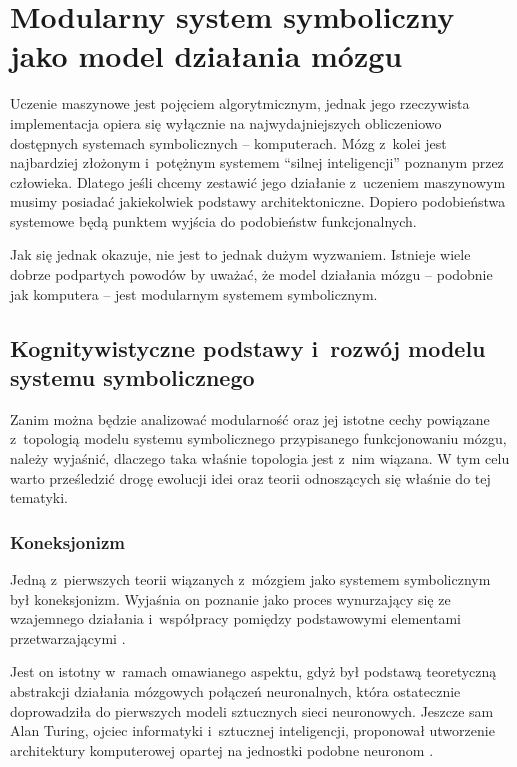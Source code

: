 \chapter{Modularny system symboliczny jako model działania mózgu}
\label{ch:modularity}

Uczenie maszynowe jest pojęciem algorytmicznym, jednak jego rzeczywista implementacja opiera się wyłącznie na najwydajniejszych obliczeniowo dostępnych systemach symbolicznych -- komputerach.
Mózg z~kolei jest najbardziej złożonym i~potężnym systemem ``silnej inteligencji'' poznanym przez człowieka.
Dlatego jeśli chcemy zestawić jego działanie z~uczeniem maszynowym musimy posiadać jakiekolwiek podstawy architektoniczne.
Dopiero podobieństwa systemowe będą punktem wyjścia do podobieństw funkcjonalnych.

Jak się jednak okazuje, nie jest to jednak dużym wyzwaniem.
Istnieje wiele dobrze podpartych powodów by uważać, że model działania mózgu -- podobnie jak komputera -- jest modularnym systemem symbolicznym.

\section{Kognitywistyczne podstawy i~rozwój modelu systemu symbolicznego}
\label{cognitive-basics}

Zanim można będzie analizować modularność oraz jej istotne cechy powiązane z~topologią modelu systemu symbolicznego przypisanego funkcjonowaniu mózgu, należy wyjaśnić, dlaczego taka właśnie topologia jest z~nim wiązana.
W tym celu warto prześledzić drogę ewolucji idei oraz teorii odnoszących się właśnie do tej tematyki.

\subsection{Koneksjonizm}

Jedną z~pierwszych teorii wiązanych z~mózgiem jako systemem symbolicznym był koneksjonizm.
Wyjaśnia on poznanie jako proces wynurzający się ze wzajemnego działania i~współpracy pomiędzy podstawowymi elementami przetwarzającymi \cite{bechtel1993case}.

Jest on istotny w~ramach omawianego aspektu, gdyż był podstawą teoretyczną abstrakcji działania mózgowych połączeń neuronalnych, która ostatecznie doprowadziła do pierwszych modeli sztucznych sieci neuronowych.
Jeszcze sam Alan Turing, ojciec informatyki i~sztucznej inteligencji, proponował utworzenie architektury komputerowej opartej na jednostki podobne neuronom \cite{copeland1996alan}.

